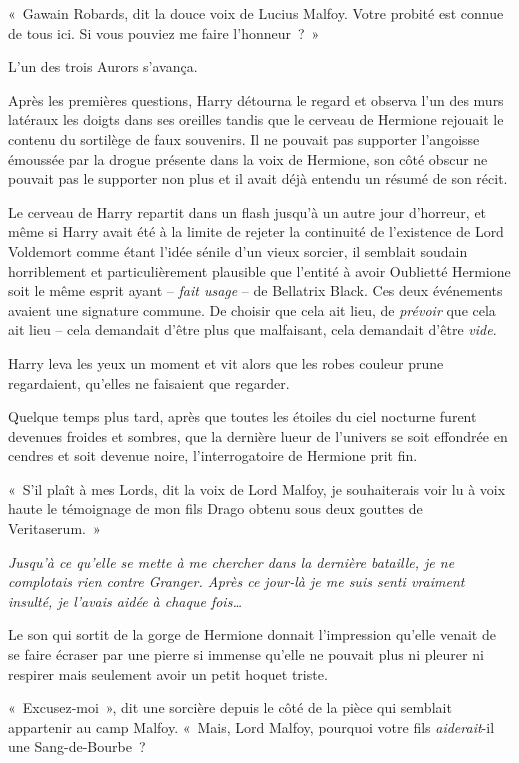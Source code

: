 «~Gawain Robards, dit la douce voix de Lucius Malfoy.
Votre probité est connue de tous ici.
Si vous pouviez me faire l'honneur~?~»

L'un des trois Aurors s'avança.

Après les premières questions, Harry détourna le regard et observa l'un des murs latéraux les doigts dans ses oreilles tandis que le cerveau de Hermione rejouait le contenu du sortilège de faux souvenirs.
Il ne pouvait pas supporter l'angoisse émoussée par la drogue présente dans la voix de Hermione, son côté obscur ne pouvait pas le supporter non plus et il avait déjà entendu un résumé de son récit.

Le cerveau de Harry repartit dans un flash jusqu'à un autre jour d'horreur, et même si Harry avait été à la limite de rejeter la continuité de l'existence de Lord Voldemort comme étant l'idée sénile d'un vieux sorcier, il semblait soudain horriblement et particulièrement plausible que l'entité à avoir Oublietté Hermione soit le même esprit ayant -- \emph{fait usage} -- de Bellatrix Black.
Ces deux événements avaient une signature commune.
De choisir que cela ait lieu, de \emph{prévoir} que cela ait lieu -- cela demandait d'être plus que malfaisant, cela demandait d'être \emph{vide}.

Harry leva les yeux un moment et vit alors que les robes couleur prune regardaient, qu'elles ne faisaient que regarder.

Quelque temps plus tard, après que toutes les étoiles du ciel nocturne furent devenues froides et sombres, que la dernière lueur de l'univers se soit effondrée en cendres et soit devenue noire, l'interrogatoire de Hermione prit fin.

«~S'il plaît à mes Lords, dit la voix de Lord Malfoy, je souhaiterais voir lu à voix haute le témoignage de mon fils Drago obtenu sous deux gouttes de Veritaserum.~»

\emph{Jusqu'à ce qu'elle se mette à me chercher dans la dernière bataille, je ne complotais rien contre Granger.
Après ce jour-là je me suis senti vraiment insulté, je l'avais aidée à chaque fois…}

Le son qui sortit de la gorge de Hermione donnait l'impression qu'elle venait de se faire écraser par une pierre si immense qu'elle ne pouvait plus ni pleurer ni respirer mais seulement avoir un petit hoquet triste.

«~Excusez-moi~», dit une sorcière depuis le côté de la pièce qui semblait appartenir au camp Malfoy.
«~Mais, Lord Malfoy, pourquoi votre fils \emph{aiderait}-il une Sang-de-Bourbe~?

